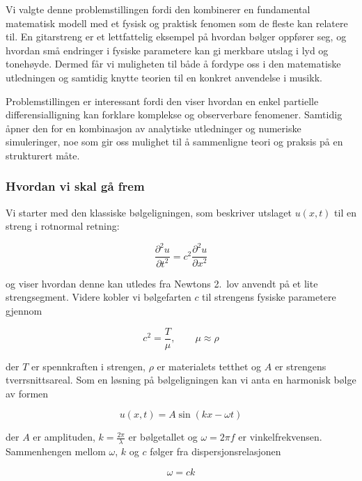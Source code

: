Vi valgte denne problemstillingen fordi den kombinerer en fundamental matematisk modell 
med et fysisk og praktisk fenomen som de fleste kan relatere til. En gitarstreng er et lettfattelig
eksempel på hvordan bølger oppfører seg, og hvordan små endringer i fysiske parametere kan gi 
merkbare utslag i lyd og tonehøyde. Dermed får vi muligheten til både å fordype oss i 
den matematiske utledningen og samtidig knytte teorien til en konkret anvendelse i musikk.

Problemstillingen er interessant fordi den viser hvordan en enkel partielle differensialligning 
kan forklare komplekse og observerbare fenomener. Samtidig åpner den for en kombinasjon 
av analytiske utledninger og numeriske simuleringer, noe som gir oss mulighet til å sammenligne 
teori og praksis på en strukturert måte.

\subsubsection*{Hvordan vi skal gå frem}

Vi starter med den klassiske bølgeligningen, som beskriver utslaget $u(x,t)$ til en streng i rotnormal retning:

\begin{equation*}
  \frac{\partial^2 u}{\partial t^2} = c^2 \frac{\partial^2 u}{\partial x^2}
  \label{eq:bolgeligningen}
\end{equation*}

og viser hvordan denne kan utledes fra Newtons 2.~lov anvendt på et lite strengsegment.
Videre kobler vi bølgefarten $c$ til strengens fysiske parametere gjennom

\begin{equation}
  c^2 = \frac{T}{\mu}, \qquad \mu \approx \rho 
\end{equation}

der $T$ er spennkraften i strengen, $\rho$ er materialets tetthet og $A$ er strengens tverrsnittsareal.
Som en løsning på bølgeligningen kan vi anta en harmonisk bølge av formen

\begin{equation*}
  u(x,t) = A \sin(kx - \omega t)
\end{equation*}

der $A$ er amplituden, $k=\tfrac{2\pi}{\lambda}$ er bølgetallet og $\omega = 2\pi f$ er vinkelfrekvensen.  
Sammenhengen mellom $\omega$, $k$ og $c$ følger fra dispersjonsrelasjonen

\begin{equation*}
  \omega = c k
\end{equation*}

